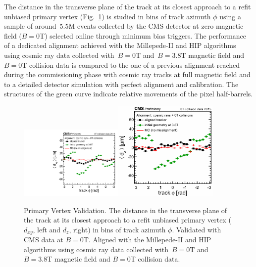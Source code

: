 The distance in the transverse plane of the track at its closest approach to a refit unbiased primary vertex (Fig.~\ref{fig:PVvalidation}) is studied in bins of track azimuth $\phi$ using a sample of around~5.5M events collected by the CMS detector at zero magnetic field ($B=0$T) selected online through minimum bias triggers. The performance of a dedicated alignment achieved with the Millepede-II and HIP algorithms using cosmic ray data collected with~$B=0$T and~$B=3.8$T magnetic field and~$B=0$T collision data is compared to the one of a previous alignment reached during the commissioning phase with cosmic ray tracks at full magnetic field and to a detailed detector simulation with perfect alignment and calibration. The structures of the green curve indicate relative movements of the pixel half-barrels.

\begin{figure}[htb]
    \begin{center}
        \includegraphics[width=0.45\textwidth]{../figs/Alignment/AlRes_dxyPhiBiasCanvas.pdf}\includegraphics[width=0.45\textwidth]{../figs/Alignment/AlRes_dzPhiBiasCanvas.png}
    \end{center}
    \caption{Primary Vertex Validation. The distance in the transverse plane of the track at its closest approach to a refit unbiased primary vertex ($d_{xy}$, left and $d_z$, right) in bins of track azimuth $\phi$. Validated with CMS data at $B=0$T. Aligned with the Millepede-II and HIP algorithms using cosmic ray data collected with~$B=0$T and~$B=3.8$T magnetic field and $B=0$T collision data. }
    \label{fig:PVvalidation}
\end{figure}

